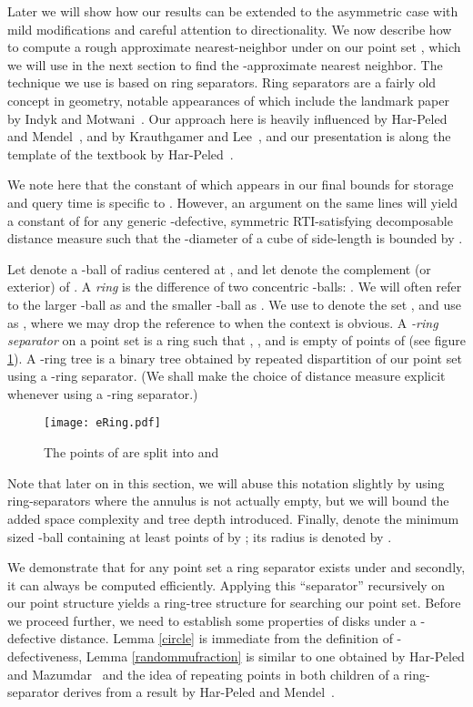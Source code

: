 \documentclass[11pt]{myclass}
\begin{document}
Later we will show how our results can be extended to the asymmetric case with mild modifications and careful attention to
directionality.
We now describe how to compute a  
rough approximate nearest-neighbor under  on our point set , 
which we will use in the next section to find the -approximate nearest neighbor. 
The technique we use is based on ring separators. Ring separators are a fairly old concept in geometry, 
notable appearances of which include the landmark paper by Indyk and Motwani~\cite{indykmotwani}. 
Our approach here is heavily influenced by Har-Peled and Mendel~\cite{peledmendel}, 
and by Krauthgamer and Lee~\cite{blackbox}, 
and our presentation is along the template of the textbook by Har-Peled~\cite[Chapter 11]{snotes}.
 
We note here that the constant of  which appears in our final bounds for storage and query time
 is specific to . However, an argument on the same lines will yield a constant of 
for any generic -defective, symmetric RTI-satisfying decomposable distance measure  such that 
the -diameter of a cube of side-length  is bounded by . 

Let  denote a -ball of radius  centered at , and let  denote the complement
 (or exterior) of . A \emph{ring}  is the difference of two concentric -balls: 
. We will often refer to the larger -ball  
as  and the smaller -ball as . We use  to denote the set
 , and use  as , where
 we may drop the reference to  when the context is obvious. 
A \emph{-ring separator}  on a point set  is a ring such that 
, , 
 and  is empty of points of  (see figure \ref{eRing}). A -ring tree is a binary tree obtained
by repeated dispartition of our point set  using a -ring separator. (We shall make the choice of distance measure 
explicit whenever using a -ring separator.)
\begin{figure}[H]
  \begin{center}
    \texttt{[image: eRing.pdf]}
  \end{center}
  \caption{The points of  are split into  and }
  \label{eRing}
\end{figure}


Note that later on in this section, we will abuse this notation slightly by using ring-separators where the annulus
is not actually empty, but we will bound the added space complexity and tree depth introduced. Finally,  denote the minimum sized -ball containing at least  points of  by ; 
its radius is denoted by . 

We demonstrate that for any point set  a ring separator exists under  and secondly, it can always be computed efficiently.  
Applying this ``separator'' recursively on our point structure yields a ring-tree structure for searching our point set.  Before we proceed further, we need to establish some properties of disks under a -defective distance.
Lemma \ref{circle} is immediate from the definition of -defectiveness, Lemma \ref{randommufraction}
is similar to one obtained by Har-Peled and Mazumdar~\cite{smallestdisk} and the idea of 
repeating points in both children of a ring-separator derives from a result by Har-Peled and 
Mendel~\cite{peledmendel}. 
\end{document}
